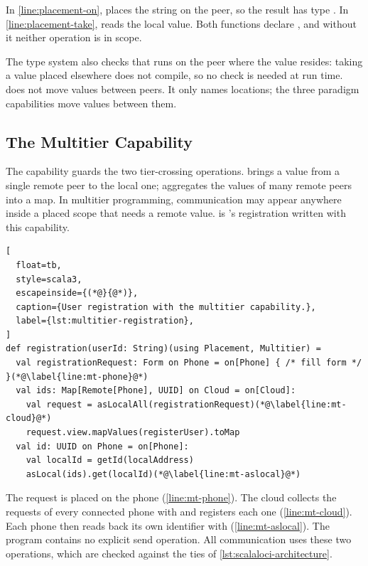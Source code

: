 In \cref{line:placement-on},  places the string on the  peer,
so the result has type \;\;.
%
In \cref{line:placement-take},  reads the local value.
%
Both functions declare , and without it neither operation is in scope.

The type system also checks that  runs on the peer where the value resides:
taking a value placed elsewhere does not compile, so no check is needed at run time.
%
 does not move values between peers.
It only names locations; the three paradigm capabilities move values between them.

\subsection{The Multitier Capability}
\label{subsec:multitier-capability}

The  capability guards the two tier-crossing operations.
%
 brings a value from a single remote peer to the local one;
 aggregates the values of many remote peers into a map.
%
In multitier programming, communication may appear anywhere inside a placed scope that needs a remote value.
%
 is \cityevt's registration written with this capability.

\begin{lstlisting}[
  float=tb,
  style=scala3,
  escapeinside={(*@}{@*)},
  caption={User registration with the multitier capability.},
  label={lst:multitier-registration},
]
def registration(userId: String)(using Placement, Multitier) =
  val registrationRequest: Form on Phone = on[Phone] { /* fill form */ }(*@\label{line:mt-phone}@*)
  val ids: Map[Remote[Phone], UUID] on Cloud = on[Cloud]:
    val request = asLocalAll(registrationRequest)(*@\label{line:mt-cloud}@*)
    request.view.mapValues(registerUser).toMap
  val id: UUID on Phone = on[Phone]:
    val localId = getId(localAddress)
    asLocal(ids).get(localId)(*@\label{line:mt-aslocal}@*)
\end{lstlisting}

The request is placed on the phone (\cref{line:mt-phone}).
%
The cloud collects the requests of every connected phone with  and registers each one (\cref{line:mt-cloud}).
%
Each phone then reads back its own identifier with  (\cref{line:mt-aslocal}).
%
The program contains no explicit send operation.
All communication uses these two operations,
which are checked against the ties of \cref{lst:scalaloci-architecture}.

